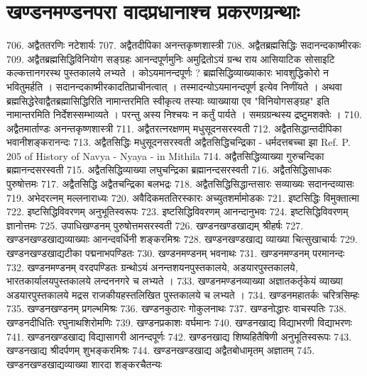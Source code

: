 \chapter{खण्डनमण्डनपरा वादप्रधानाश्च प्रकरणग्रन्थाः }
706. अद्वैततरणिः 							नटेशार्यः
707. अद्वैतदीपिका							अनन्तकृष्णशास्त्री
708. अद्वैतब्रह्मसिद्धिः 						सदानन्दकाष्मीरकः
709. अद्वैतब्रह्मसिद्धिविनियोग सङ्ग्रहः		आनन्दपूर्णमुनिः 
		अमुद्रितोऽयं ग्रन्थ राय आसियाटिक सोसाइटि कल्कत्तानगरस्थ पुस्तकालये लभ्यते । कोऽयमानन्दपूर्णः ? ब्रह्मसिद्धिव्याख्याकारः भावशुद्धिकोरो न भवितुमर्हति । सदानन्दकाष्मीरकादतिप्राचीनत्वात् । तस्मादन्योऽयमानन्दपूर्ण इत्येव निणींयते । अथवा ब्रह्मसिद्धेरेवाद्वैतब्रह्मासिद्धिरिति नामान्तरमिति स्वीकृत्य तस्याः व्याख्याया एव "विनियोगसङ्ग्रह" इति नामान्तरमिति निर्देशस्सम्भाव्यते । परन्तु अस्य निश्चयः न कर्तुं पार्यते । समग्रग्रन्थस्य द्रष्टुमशक्तेः । 
710. अद्वैतमार्ताण्डः							अनन्तकृष्णशास्त्री
711. अद्वैतरत्नरक्षणम्						मधुसूदनसरस्वती
712. अद्वैतसिद्धान्तदीपिका 					भवानीशङ्करानन्दः
713. अद्वैतसिद्धिः							मधुसूदनसरस्वती
		अद्वैतसिद्धिचन्द्रिका - धर्मदत्तबच्चा झा Ref. P. 205 of History of Navya - Nyaya - in Mithila
714. अद्वैतसिद्धिव्याख्या गुरुचन्दिका 		ब्रह्मानन्दसरस्वती
715. अद्वैतसिद्धिव्याख्या लघुचन्द्रिका		ब्रह्मानन्दसरस्वती
716. अद्वैतसिद्धिसाधकः						पुरुषोत्तमः
717. अद्वैतसिद्धि अद्वैतचन्द्रिका				बलभद्रः
718. अद्वैतसिद्धिसिद्धान्तसारः सव्याख्यः	सदानन्दव्यासः
719. अभेदरत्नम् 							मल्लनाराध्यः
720. अवैदिकमततिरस्कारः					अच्युतशर्मामोडकः
721. इष्टसिद्धिः								विमुक्तात्मा
722. इष्टसिद्धिविवरणम्						अनुभूतिस्वरूपः
723. इष्टसिद्धिविवरणम् 						आनन्दानुभवः
724. इष्टसिद्धिविवरणम्						ज्ञानोत्तमः
725. उपाधिखण्डनम् 						पुरुषोत्तमसरस्वती
726. खण्डनखण्डखाद्यम् 					श्रीहर्षः
727.	खण्डनखण्डखाद्यव्याख्याः आनन्दवर्धिनी शङ्करमिश्रः
728. खण्डनखण्डखाद्य व्याख्या 			चित्सुखाचार्यः
729. खण्डनखण्डखाद्यटीका				पद्मनाभपण्डितः
730. खण्डनमण्डनम्						भवनाथः
731. खण्डनमण्डनम् 						परमानन्दः 
732. खण्डनमण्डनम् 						वरदपण्डितः
		ग्रन्थोऽयं अनन्तशयनपुस्तकालये, अडयारपुस्तकालये, भारतकार्यालयपुस्तकालये लन्दननगरे च लभ्यते । 
733. खण्डनमण्डनव्याख्या
		अज्ञातकर्तृकेयं व्याख्या अडयारपुस्तकालये मद्रस राजकीयहस्तलिखित पुस्तकालये च लभ्यते । 
734. खण्डनमहातर्कः						चरित्रसिम्हः
735. खण्डनखण्डनम् 						प्रगल्भमिश्रः
736. खण्डनकुठारः							गोकुलनाथः
737. खण्डनोद्धारः							वाचस्पतिः
738. खण्डनदीधितिः						रघुनाथशिरोमणिः
739. खण्डनप्रकाशः							वर्घमानः
740. खण्डनखाद्य विद्याभरणी				विद्याभरणः
741. खण्डनखण्डखाद्य विद्यासागरी			आनन्दपूर्णः
742. खण्डनखाद्य शिष्यहितैषिणी			अनुभूतिस्वरूपः
743. खण्डनखाद्य श्रीदर्पणम् 				शुभङ्करमिश्रः
744. खण्डनखण्डखाद्य अद्वैतबोधामृतम् 	अज्ञातम् 
745. खण्डनखण्डखाद्यव्याख्या शारदा		शङ्करचैतन्यः 

